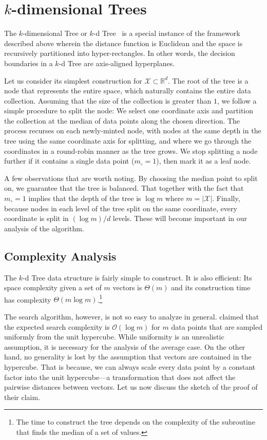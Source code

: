 \section{\texorpdfstring{$k$}{k}-dimensional Trees}
\label{section:branch-and-bound:kd-tree}

The $k$-dimensional Tree or $k$-d Tree~\citep{kdtree} is a special instance of the framework
described above wherein the distance function is Euclidean
and the space is recursively partitioned into hyper-rectangles.
In other words, the decision boundaries in a $k$-d Tree are axis-aligned hyperplanes.

Let us consider its simplest construction for $\mathcal{X} \subset \mathbb{R}^d$.
The root of the tree is a node that represents the entire space, which naturally
contains the entire data collection. Assuming that the size of the collection
is greater than $1$, we follow a simple procedure to split the node:
We select one coordinate axis and partition the collection at the
median of data points along the chosen direction.
The process recurses on each newly-minted node, with nodes at the same depth in the tree using the same
coordinate axis for splitting, and where we go through the coordinates in a round-robin
manner as the tree grows. We stop splitting a node further if it contains a single
data point ($m_\circ = 1$), then mark it as a leaf node.

A few observations that are worth noting.
By choosing the median point to split on, we guarantee that the tree is balanced.
That together with the fact that $m_\circ = 1$ implies that
the depth of the tree is $\log m$ where $m = \lvert \mathcal{X} \rvert$.
Finally, because nodes in each level of the tree split on the same coordinate,
every coordinate is split in $(\log m) /d$ levels. These will become important
in our analysis of the algorithm.

\subsection{Complexity Analysis}
The $k$-d Tree data structure is fairly simple to construct. It is also
efficient: Its space complexity given a set of $m$ vectors is $\Theta(m)$
and its construction time has complexity $\Theta(m \log m)$.\footnote{
The time to construct the tree depends on the complexity of the subroutine
that finds the median of a set of values.}

The search algorithm, however, is not so easy to analyze in general.
\cite{freidman1977kdtree_proof} claimed that the expected search complexity
is $\mathcal{O}(\log m)$ for $m$ data points that are sampled uniformly
from the unit hypercube. While uniformity is an unrealistic assumption,
it is necessary for the analysis of the average case.
On the other hand, no generality is lost by the assumption that vectors
are contained in the hypercube. That is because, we can always scale every data
point by a constant factor into the unit hypercube---a transformation
that does not affect the pairwise distances between vectors.
Let us now discuss the sketch of the proof of their claim.

